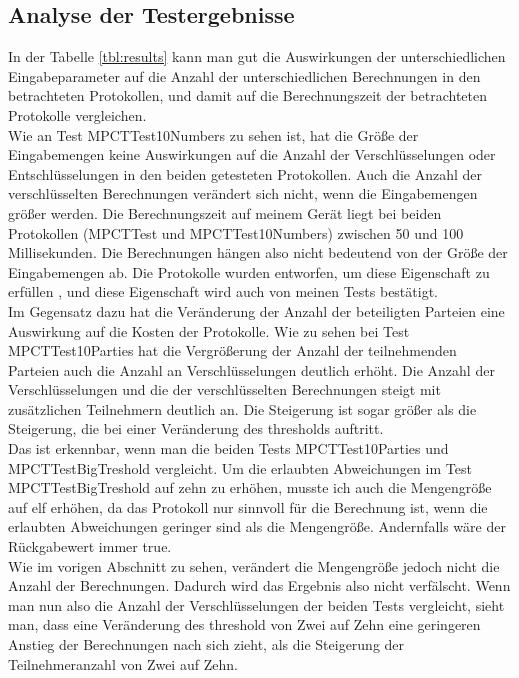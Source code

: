 \subsection{Analyse der Testergebnisse}
In der Tabelle \ref{tbl:results} kann man gut die Auswirkungen der unterschiedlichen Eingabeparameter auf die Anzahl der unterschiedlichen Berechnungen in den betrachteten Protokollen, und damit auf die Berechnungszeit der betrachteten Protokolle vergleichen.\\
Wie an Test MPCTTest10Numbers zu sehen ist, hat die Größe der Eingabemengen keine Auswirkungen auf die Anzahl der Verschlüsselungen oder Entschlüsselungen in den beiden getesteten Protokollen. Auch die Anzahl der verschlüsselten Berechnungen verändert sich nicht, wenn die Eingabemengen größer werden. Die Berechnungszeit auf meinem Gerät liegt bei beiden Protokollen (MPCTTest und MPCTTest10Numbers) zwischen 50 und 100 Millisekunden. Die Berechnungen hängen also nicht bedeutend von der Größe der Eingabemengen ab. Die Protokolle wurden entworfen, um diese Eigenschaft zu erfüllen \cite{Doettling2021}, und diese Eigenschaft wird auch von meinen Tests bestätigt.\\
Im Gegensatz dazu hat die Veränderung der Anzahl der beteiligten Parteien eine Auswirkung auf die Kosten der Protokolle. Wie zu sehen bei Test MPCTTest10Parties hat die Vergrößerung der Anzahl der teilnehmenden Parteien auch die Anzahl an Verschlüsselungen deutlich erhöht. Die Anzahl der Verschlüsselungen und die der verschlüsselten Berechnungen steigt mit zusätzlichen Teilnehmern deutlich an. Die Steigerung ist sogar größer als die Steigerung, die bei einer Veränderung des thresholds auftritt.\\
Das ist erkennbar, wenn man die beiden Tests MPCTTest10Parties und MPCTTestBigTreshold vergleicht. Um die erlaubten Abweichungen im Test MPCTTestBigTreshold auf zehn zu erhöhen, musste ich auch die Mengengröße auf elf erhöhen, da das Protokoll nur sinnvoll für die Berechnung ist, wenn die erlaubten Abweichungen geringer sind als die Mengengröße. Andernfalls wäre der Rückgabewert immer true.\\
Wie im vorigen Abschnitt zu sehen, verändert die Mengengröße jedoch nicht die Anzahl der Berechnungen. Dadurch wird das Ergebnis also nicht verfälscht.
Wenn man nun also die Anzahl der Verschlüsselungen der beiden Tests vergleicht, sieht man, dass eine Veränderung des threshold von Zwei auf Zehn eine geringeren Anstieg der Berechnungen nach sich zieht, als die Steigerung der Teilnehmeranzahl von Zwei auf Zehn.\\
